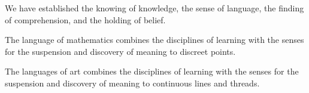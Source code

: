 

We have established the knowing of knowledge, the sense of language,
the finding of comprehension, and the holding of belief.

The language of mathematics combines the disciplines of learning with
the senses for the suspension and discovery of meaning to discreet
points.

The languages of art combines the disciplines of learning with the
senses for the suspension and discovery of meaning to continuous lines
and threads.


\bye
